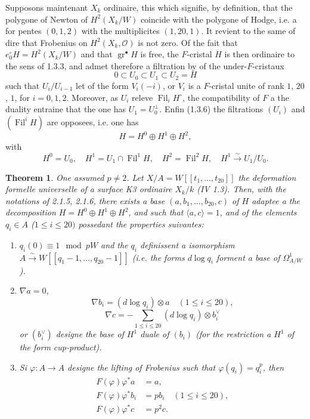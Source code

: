 \documentclass[12pt,a4paper]{article}
\theoremstyle{plain}
\newtheorem{theorem}{Theorem}[section]
\theoremstyle{definition}
\theoremstyle{remark}
\DeclareMathOperator{\Fil}{Fil}
\DeclareMathOperator{\gr}{gr}
\begin{document}
\subsubsection{}
Supposons maintenant $X_k$ ordinaire, this which signifie, by definition, that the polygone of Newton of $H^2(X_k/W)$ coincide with the polygone of Hodge, i.e. a for pentes $(0, 1, 2)$ with the multiplicites $(1, 20, 1)$. It revient to the same of dire that Frobenius on $H^2(X_k, \mathcal{O})$ is not zero. Of the fait that $e^\circ_0 H = H^2(X_k/W)$ and that $\gr^\bullet H$ is free, the $F$-cristal $H$ is then ordinaire to the sens of 1.3.3, and admet therefore a filtration by of the under-$F$-cristaux
\[
0 \subset U_0 \subset U_1 \subset U_2 = H
\]
such that $U_i/U_{i-1}$ let of the form $V_i(-i)$, or $V_i$ is a $F$-cristal unite of rank $1$, $20$, $1$, for $i = 0, 1, 2$. Moreover, as $U_i$ releve $\Fil_i H^\circ$, the compatibility of $F$ a the duality entraine that the one has $U_1 = U_0^\perp$. Enfin (1.3.6) the filtrations $(U_i)$ and $(\Fil^i H)$ are opposees, i.e. one has
\[
H = H^0 \oplus H^1 \oplus H^2,
\]
with
\[
H^0 = U_0, \quad H^1 = U_1 \cap \Fil^1 H, \quad H^2 = \Fil^2 H, \quad H^1 \xrightarrow{\sim} U_1/U_0.
\]

\begin{theorem}\label{thm:2.1.7}
One assumed $p \neq 2$. Let $X/A = W[[t_1, \ldots, t_{20}]]$ the deformation formelle universelle of a surface K3 ordinaire $X_k/k$ (IV 1.3). Then, with the notations of 2.1.5, 2.1.6, there exists a base $(a, b_1, \ldots, b_{20}, c)$ of $H$ adaptee a the decomposition $H = H^0 \oplus H^1 \oplus H^2$, and such that $\langle a, c \rangle = 1$, and of the elements $q_i \in A$ ($1 \leqslant i \leqslant 20)$ possedant the properties suivantes:
\begin{enumerate}[label=(\roman*)]
\item $q_i(0) \equiv 1 \mod pW$ and the $q_i$ definissent a isomorphism $A \xrightarrow{\sim} W[[q_1 - 1, \ldots, q_{20} - 1]]$ (i.e. the forms $d\log q_i$ forment a base of $\Omega^1_{A/W}$).
\item $\nabla a = 0$,
\[
\nabla b_i = (d\log q_i) \otimes a \quad (1 \leqslant i \leqslant 20),
\]
\[
\nabla c = -\sum_{1\leqslant i\leqslant 20} (d\log q_i) \otimes b_i^\vee
\]
or $(b_i^\vee)$ designe the base of $H^1$ duale of $(b_i)$ (for the restriction a $H^1$ of the form cup-product).
\item Si $\varphi : A \to A$ designe the lifting of Frobenius such that $\varphi(q_i) = q_i^p$, then
\begin{align*}
F(\varphi)\varphi^* a &= a, \\
F(\varphi)\varphi^* b_i &= pb_i \quad (1 \leqslant i \leqslant 20), \\
F(\varphi)\varphi^* c &= p^2 c.
\end{align*}
\end{enumerate}
\end{theorem}
\end{document}
